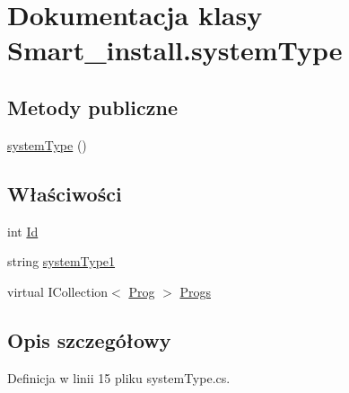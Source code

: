 \hypertarget{class_smart__install_1_1system_type}{\section{Dokumentacja klasy Smart\+\_\+install.\+system\+Type}
\label{class_smart__install_1_1system_type}
}
\subsection*{Metody publiczne}
\begin{DoxyCompactItemize}
\item 
\hyperlink{class_smart__install_1_1system_type_a7fa7fcae28e9d656807f49d1651155ee}{system\+Type} ()
\end{DoxyCompactItemize}
\subsection*{Właściwości}
\begin{DoxyCompactItemize}
\item 
int \hyperlink{class_smart__install_1_1system_type_a0dfa34284a4c4bbc9a682f5b3f95ec1b}{Id}
\item 
string \hyperlink{class_smart__install_1_1system_type_ae3ceae4fd9a795c8305c83f10745ae8a}{system\+Type1}
\item 
virtual I\+Collection$<$ \hyperlink{class_smart__install_1_1_prog}{Prog} $>$ \hyperlink{class_smart__install_1_1system_type_aa7063d42f76eda31b19b3e327146c19a}{Progs}
\end{DoxyCompactItemize}


\subsection{Opis szczegółowy}


Definicja w linii 15 pliku system\+Type.\+cs.



